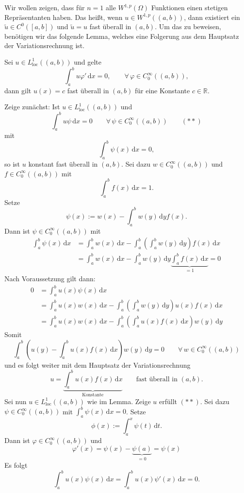 Wir wollen zeigen, dass für $n=1$ alle $W^{1,p}(\Omega)$ Funktionen einen stetigen Repräsentanten haben. Das heißt, wenn $u \in W^{1,p}((a,b))$, dann existiert ein 
$ \tilde u \in C^0([a,b])$ und $\tilde u = u$ fast überall in $(a,b)$. Um das zu beweisen, benötigen wir das folgende Lemma, welches eine Folgerung aus dem Hauptsatz der Variationsrechnung ist.
\begin{lemma}
	Sei $u \in L^1_{\text{loc}}((a,b))$ und gelte
	\[
		\int_{a}^{b} u \varphi' \,\mathrm{d}x = 0, \qquad \forall\, \varphi \in C^{\infty}_0((a,b)),
	\]
	dann gilt $u(x)= c$ fast überall in $(a,b)$ für eine Konstante $c \in \mathbb{R}$.
	
\end{lemma}
\begin{beweis}
	Zeige zunächst: Ist $u \in L^1_{\text{loc}}((a,b))$ und 
	\[
		\int_{a}^{b} u \psi \,\mathrm{d}x = 0 \qquad \forall\, \psi \in C^{\infty}_0((a,b))  \qquad (**)
	\]
	mit
	\[
		\int_{a}^{b}\psi(x) \,\mathrm{d}x = 0,
	\]
	so ist $u$ konstant fast überall in $(a,b)$. Sei dazu $w \in C^{\infty}_0((a,b))$ und $f \in C^{\infty}_0((a,b))$ mit 
	\[
		\int_{a}^{b}f(x) \,\mathrm{d}x =1.
	\]
	Setze \[
		\psi(x) := w(x) - \int_{a}^{b} w(y) \,\mathrm{d}y f(x).
	\]
	Dann ist $\psi \in C^{\infty}_0((a,b))$ mit 
	\begin{align*}
		\int_{a}^{b} \psi(x) \,\mathrm{d}x &= \int_{a}^{b}w(x) \,\mathrm{d}x - \int_{a}^{b} \left( \int_{a}^{b} w(y) \,\mathrm{d}y  \right) f(x) \,\mathrm{d}x \\
		&= \int_{a}^{b}w(x) \,\mathrm{d}x - \int_{a}^{b} w(y) \,\mathrm{d}y \underset{=1}{\underbrace{\int_{a}^{b} f(x) \,\mathrm{d}x}} =0
	\end{align*}
	Nach Voraussetzung gilt dann:
	\begin{align*}
		0 &= \int_{a}^{b}u(x)\psi(x) \,\mathrm{d}x  \\ 
		&= \int_{a}^{b} u(x)w(x) \,\mathrm{d}x - \int_{a}^{b}\left( \int_{a}^{b}w(y) \,\mathrm{d}y \right) u(x)f(x) \,\mathrm{d}x \\
		&= \int_{a}^{b}u(x)w(x) \,\mathrm{d}x - \int_{a}^{b} \left( \int_{a}^{b}u(x)f(x) \,\mathrm{d}x \right) w(y) \,\mathrm{d}y 
	\end{align*}
	Somit
	\[
		\int_{a}^{b}\left( u(y)- \int_{a}^{b} u(x)f(x) \,\mathrm{d}x \right) w(y) \,\mathrm{d}y = 0 \qquad \forall\, w \in C^{\infty}_0((a,b))
	\]
	und es folgt weiter mit dem Hauptsatz der Variationsrechnung
	\[
		u = \underset{\text{Konstante}}{\underbrace{\int_{a}^{b}u(x)f(x) \,\mathrm{d}x}} \qquad \text{fast überall in }(a,b).
	\]
	Sei nun $u \in L^1_{\text{loc}}((a,b))$ wie im Lemma. Zeige $u$ erfüllt $(**)$. Sei dazu $ \psi \in C^{\infty}_0((a,b))$ mit $\int_{a}^{b}\psi(x) \,\mathrm{d}x =0$.
	Setze
	\[
		\phi(x):= \int_{a}^{x}\psi(t) \,\mathrm{d}t.
	\]
	Dann ist $\varphi \in C^{\infty}_0((a,b))$ und 
	\[
		\varphi'(x) = \psi(x) - \underset{=0}{\underbrace{\psi(a)}} = \psi(x)
	\]
	Es folgt
	\[
		\int_{a}^{b} u(x) \psi(x) \,\mathrm{d}x = \int_{a}^{b} u(x)\psi'(x) \,\mathrm{d}x =0.
	\]
\end{beweis}

